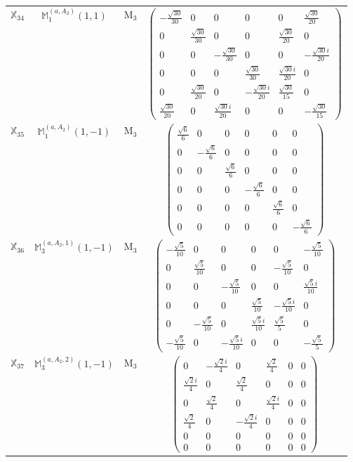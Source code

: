 \documentclass[fleqn,10pt,landscape]{article}
\begin{document}
\begin{itemize}
\begin{center}
\begin{longtable}{c|c|c|c}
$ \mathbb{X}_{34} $ & $\mathbb{M}_{1}^{(a,A_{2})}(1,1)$ & M$_{3}$ & $\begin{pmatrix} - \frac{\sqrt{30}}{30} & 0 & 0 & 0 & 0 & \frac{\sqrt{30}}{20} \\ 0 & \frac{\sqrt{30}}{30} & 0 & 0 & \frac{\sqrt{30}}{20} & 0 \\ 0 & 0 & - \frac{\sqrt{30}}{30} & 0 & 0 & - \frac{\sqrt{30} i}{20} \\ 0 & 0 & 0 & \frac{\sqrt{30}}{30} & \frac{\sqrt{30} i}{20} & 0 \\ 0 & \frac{\sqrt{30}}{20} & 0 & - \frac{\sqrt{30} i}{20} & \frac{\sqrt{30}}{15} & 0 \\ \frac{\sqrt{30}}{20} & 0 & \frac{\sqrt{30} i}{20} & 0 & 0 & - \frac{\sqrt{30}}{15} \end{pmatrix}$ \\
$ \mathbb{X}_{35} $ & $\mathbb{M}_{1}^{(a,A_{2})}(1,-1)$ & M$_{3}$ & $\begin{pmatrix} \frac{\sqrt{6}}{6} & 0 & 0 & 0 & 0 & 0 \\ 0 & - \frac{\sqrt{6}}{6} & 0 & 0 & 0 & 0 \\ 0 & 0 & \frac{\sqrt{6}}{6} & 0 & 0 & 0 \\ 0 & 0 & 0 & - \frac{\sqrt{6}}{6} & 0 & 0 \\ 0 & 0 & 0 & 0 & \frac{\sqrt{6}}{6} & 0 \\ 0 & 0 & 0 & 0 & 0 & - \frac{\sqrt{6}}{6} \end{pmatrix}$ \\
$ \mathbb{X}_{36} $ & $\mathbb{M}_{3}^{(a,A_{2},1)}(1,-1)$ & M$_{3}$ & $\begin{pmatrix} - \frac{\sqrt{5}}{10} & 0 & 0 & 0 & 0 & - \frac{\sqrt{5}}{10} \\ 0 & \frac{\sqrt{5}}{10} & 0 & 0 & - \frac{\sqrt{5}}{10} & 0 \\ 0 & 0 & - \frac{\sqrt{5}}{10} & 0 & 0 & \frac{\sqrt{5} i}{10} \\ 0 & 0 & 0 & \frac{\sqrt{5}}{10} & - \frac{\sqrt{5} i}{10} & 0 \\ 0 & - \frac{\sqrt{5}}{10} & 0 & \frac{\sqrt{5} i}{10} & \frac{\sqrt{5}}{5} & 0 \\ - \frac{\sqrt{5}}{10} & 0 & - \frac{\sqrt{5} i}{10} & 0 & 0 & - \frac{\sqrt{5}}{5} \end{pmatrix}$ \\
$ \mathbb{X}_{37} $ & $\mathbb{M}_{3}^{(a,A_{2},2)}(1,-1)$ & M$_{3}$ & $\begin{pmatrix} 0 & - \frac{\sqrt{2} i}{4} & 0 & \frac{\sqrt{2}}{4} & 0 & 0 \\ \frac{\sqrt{2} i}{4} & 0 & \frac{\sqrt{2}}{4} & 0 & 0 & 0 \\ 0 & \frac{\sqrt{2}}{4} & 0 & \frac{\sqrt{2} i}{4} & 0 & 0 \\ \frac{\sqrt{2}}{4} & 0 & - \frac{\sqrt{2} i}{4} & 0 & 0 & 0 \\ 0 & 0 & 0 & 0 & 0 & 0 \\ 0 & 0 & 0 & 0 & 0 & 0 \end{pmatrix}$ \\

\end{longtable}
\end{center}
\end{itemize}
\end{document}
